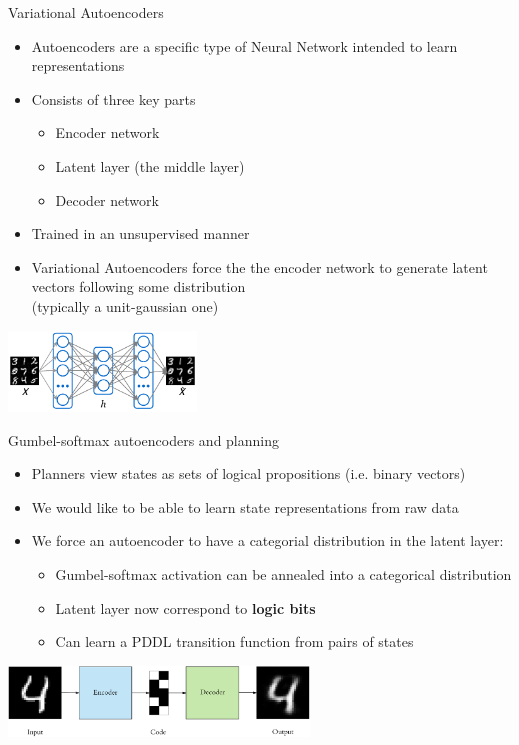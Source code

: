 \documentclass[usenames,dvipsnames]{beamer}
\begin{document}
\begin{frame}[c]{Variational Autoencoders}
	\begin{itemize}
		\item Autoencoders are a specific type of Neural Network intended to learn representations
		\item Consists of three key parts
		\begin{itemize}
			\item Encoder network
			\item Latent layer (the middle layer)
			\item Decoder network
		\end{itemize}
		\item Trained in an unsupervised manner
		\item Variational Autoencoders force the the encoder network to generate latent vectors following some distribution \\(typically a unit-gaussian one)
	\end{itemize}
	
	\begin{center}
		\includegraphics[width=5cm]{fig/autoencoder.pdf}
	\end{center}
\end{frame}


\begin{frame}[c]{Gumbel-softmax autoencoders and planning}
	\begin{itemize}
		\item Planners view states as sets of logical propositions (i.e. binary vectors)
		\item We would like to be able to learn state representations from raw data
		\item We force an autoencoder to have a categorial distribution in the latent layer:
		\begin{itemize}
			\item Gumbel-softmax activation can be annealed into a categorical distribution
			\item Latent layer now correspond to \textbf{logic bits}
			\item Can learn a PDDL transition function from pairs of states
		\end{itemize}
	\end{itemize}
	\begin{center}
		\includegraphics[width=8cm]{fig/cat-autoencoder.png}
	\end{center}
\end{frame}
\end{document}
